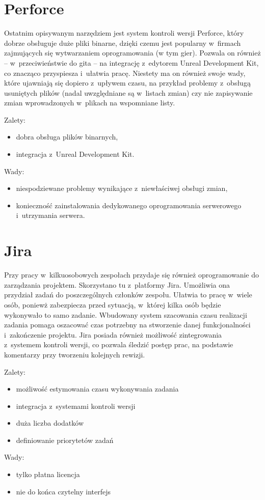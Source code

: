 \section{Perforce}

Ostatnim opisywanym narzędziem jest system kontroli wersji Perforce, który dobrze obsługuje duże pliki binarne, dzięki czemu jest popularny w~firmach zajmujących się wytwarzaniem oprogramowania (w tym gier). Pozwala on również -- w~przeciwieństwie do gita -- na integrację z~edytorem Unreal Development Kit, co znacząco przyspiesza i~ułatwia pracę. Niestety ma on również swoje wady, które ujawniają się dopiero z~upływem czasu, na przykład problemy z~obsługą usuniętych plików (nadal uwzględniane są w~listach zmian) czy nie zapisywanie zmian wprowadzonych w~plikach na wspomniane listy.

{\raggedright Zalety:
\begin{itemize}
\item dobra obsługa plików binarnych,
\item integracja z~Unreal Development Kit.
\end{itemize}

Wady:
\begin{itemize}
\item niespodziewane problemy wynikające z~niewłaściwej obsługi zmian,
\item konieczność zainstalowania dedykowanego oprogramowania serwerowego i~utrzymania serwera.
\end{itemize}
}

\section{Jira}

Przy pracy w~kilkuosobowych zespołach przydaje się również oprogramowanie do zarządzania projektem. Skorzystano tu z~platformy Jira. Umożliwia ona przydział zadań do poszczególnych członków zespołu. Ułatwia to pracę w~wiele osób, poniewż zabezpiecza przed sytuacją, w~której kilka osób będzie wykonywało to samo zadanie. Wbudowany system szacowania czasu realizacji zadania pomaga oszacować czas potrzebny na stworzenie danej funkcjonalności i~zakończenie projektu. Jira posiada również możliwość zintegrowania z~systemem kontroli wersji, co pozwala śledzić postęp prac, na podstawie komentarzy przy tworzeniu kolejnych rewizji.

{\raggedright Zalety:
\begin{itemize}
\item możliwość estymowania czasu wykonywania zadania
\item integracja z~systemami kontroli wersji
\item duża liczba dodatków
\item definiowanie priorytetów zadań
\end{itemize}

Wady:
\begin{itemize}
\item tylko płatna licencja
\item nie do końca czytelny interfejs
\end{itemize}
}